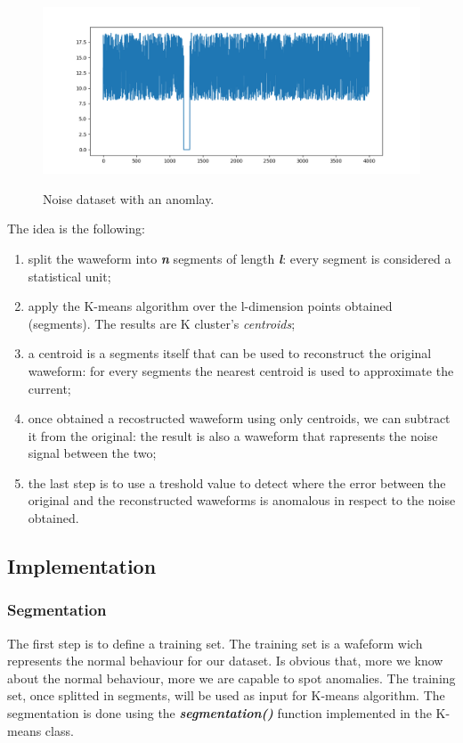 \documentclass[12pt]{article}
\begin{document}
	\begin{figure}[h!]
		\centering
		\includegraphics[scale=0.515]{img/anomaly.png}
		\label{fig4}
		\caption{Noise dataset with an anomlay.}
	\end{figure}


	The idea is the following:
	\begin{enumerate}
		\item split the waweform into \textbf{\textit{n}} segments of length \textbf{\textit{l}}: every segment is considered a statistical unit;
		\item apply the K-means algorithm over the l-dimension points obtained (segments). The results are K cluster's \textit{centroids};
		\item a centroid is a segments itself that can be used to reconstruct the original waweform: for every segments the nearest centroid is used to approximate the current;
		\item once obtained a recostructed waweform using only centroids, we can subtract it from the original: the result is also a waweform that rapresents the noise signal between the two;
		\item the last step is to use a treshold value to detect where the error between the original and the reconstructed waweforms is anomalous in respect to the noise obtained. 
	\end{enumerate}

	\subsection{Implementation}
		
		\subsubsection{Segmentation}
			The first step is to define a training set. The training set is a wafeform wich represents the normal behaviour for our dataset. Is obvious that, more we know about the normal behaviour, more we are capable to spot anomalies. The training set, once splitted in segments, will be used as input for K-means algorithm. The segmentation is done using the \textit{\textbf{segmentation()}} function implemented in the K-means class.
			
\end{document}
